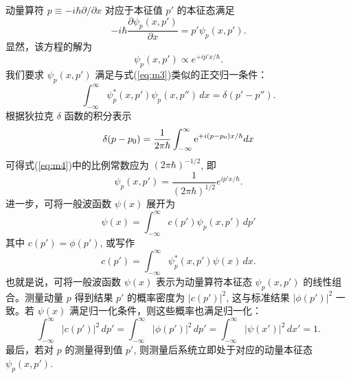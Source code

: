 动量算符 $ p \equiv -i \hbar \partial / \partial x $ 对应于本征值 $ p' $ 的本征态满足
\begin{equation}
	-i \hbar \frac{\partial \psi_p(x, p')}{\partial x} = p' \psi_p(x, p').
\end{equation}
显然，该方程的解为
\begin{equation}
	\psi_p(x, p') \propto e^{+i p' x / \hbar}. \label{eq:m4}
\end{equation}
我们要求 $ \psi_p(x, p') $ 满足与式(\ref{eq:m3})类似的正交归一条件：
\begin{equation}
	\int_{-\infty}^{\infty} \psi_p^*(x, p') \psi_p(x, p'') \, dx = \delta(p' - p'').
\end{equation}
根据狄拉克 \(\delta\) 函数的积分表示
\begin{equation}
	\delta (p - {p_0}) = \frac{1}{{2\pi \hbar }}\int_{ - \infty }^\infty  {{{\rm{e}}^{ + i\left( {p - {p_0}} \right)x/\hbar }}} dx
\end{equation}
可得式(\ref{eq:m4})中的比例常数应为 $ (2 \pi \hbar)^{-1/2} $, 即
\begin{equation}
	\displaystyle \psi_p(x, p') = \frac{1}{(2 \pi \hbar)^{1/2}}e^{i p' x / \hbar}. 
\end{equation}
进一步，可将一般波函数 $ \psi(x) $ 展开为
\begin{equation}
	\psi(x) = \int_{-\infty}^{\infty} c(p') \psi_p(x, p') \, dp'
\end{equation}
其中 $ c(p') = \phi(p') $, 或写作
\begin{equation}
	c(p') = \int_{-\infty}^{\infty} \psi_p^*(x, p') \psi(x) \, dx. 
\end{equation}
也就是说，可将一般波函数 $ \psi(x) $ 表示为动量算符本征态 $ \psi_{p}(x, p') $ 的线性组合。测量动量 $ p $ 得到结果 $ p' $ 的概率密度为 $ |c(p')|^{2} $, 这与标准结果 $ |\phi(p')|^{2} $ 一致。若 $ \psi(x) $ 满足归一化条件，则这些概率也满足归一化：
\begin{equation}
	\int_{-\infty}^{\infty} |c(p')|^2 \, dp' = \int_{-\infty}^{\infty} |\phi(p')|^2 \, dp' = \int_{-\infty}^{\infty} |\psi(x')|^2 \, dx' = 1. 
\end{equation}
最后，若对 $ p $ 的测量得到值 $ p' $, 则测量后系统立即处于对应的动量本征态 $ \psi_{p}(x, p') $.  
